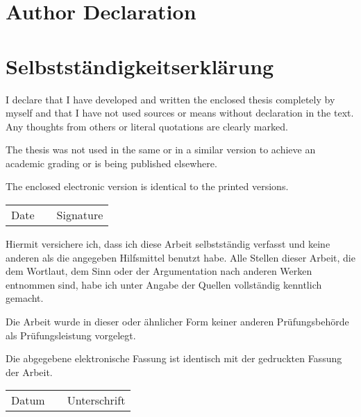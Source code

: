 \cleardoublepage
\ifenglish
\chapter*{Author Declaration}
\else
\chapter*{Selbstständigkeitserklärung}
\fi

\thispagestyle{empty}
\ifenglish
I declare that I have developed and written the enclosed thesis completely by myself and that I have not used sources or means without declaration in the text. Any thoughts from others or literal quotations are clearly marked.

The thesis was not used in the same or in a similar version to achieve an academic grading or is being published elsewhere.

The enclosed electronic version is identical to the printed versions.

\vspace*{3cm}
\begin{tabular}{ccc}
\cline{1-1} \cline{3-3} 
Date\hspace*{3cm} & \hspace*{1cm} & Signature\hspace*{5cm}\tabularnewline
\end{tabular}
\else
Hiermit versichere ich, dass ich diese Arbeit selbstständig verfasst und keine anderen als
die angegeben Hilfsmittel benutzt habe. Alle Stellen dieser Arbeit, die dem Wortlaut, dem Sinn oder der Argumentation nach anderen Werken entnommen sind, habe ich unter Angabe der Quellen vollständig kenntlich gemacht.

Die Arbeit wurde in dieser oder ähnlicher Form keiner anderen Prüfungsbehörde als Prüfungsleistung vorgelegt.

Die abgegebene elektronische Fassung ist identisch mit der gedruckten Fassung der Arbeit.

\vspace*{3cm}
\begin{tabular}{ccc}
\cline{1-1} \cline{3-3} 
Datum\hspace*{3cm} & \hspace*{1cm} & Unterschrift\hspace*{5cm}\tabularnewline
\end{tabular}
\fi


\cleardoublepage
